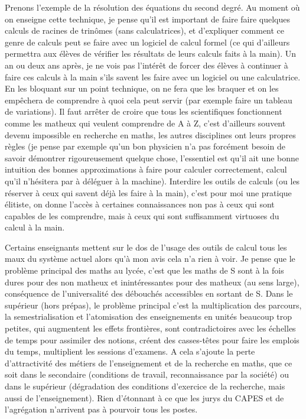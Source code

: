 \documentclass[a4paper,11pt]{book}
\begin{document}
\begin{giacjshere}
Prenons l'exemple de la r\'esolution des \'equations du second
degr\'e. Au moment o\`u on enseigne cette technique, je pense
qu'il est important de faire faire quelques calculs de racines 
de trin\^omes (sans
calculatrices), et d'expliquer comment ce genre de calculs peut
se faire avec un logiciel de calcul formel (ce qui d'ailleurs
permettra aux \'el\`eves de v\'erifier les r\'esultats
de leurs calculs faits \`a la main).
Un an ou deux ans apr\`es, je ne vois pas l'int\'er\^et de forcer
des \'el\`eves \`a continuer \`a faire ces calculs \`a la main
s'ils savent les faire avec un logiciel ou une calculatrice. En les
bloquant sur un point technique, on ne fera
que les braquer et on les emp\^echera de comprendre \`a quoi
cela peut servir (par exemple faire un tableau de variations).
Il faut arr\^eter de croire que tous les
scientifiques fonctionnent comme les matheux qui veulent
comprendre de A \`a Z, c'est d'ailleurs souvent devenu
impossible en recherche en maths, les autres disciplines
ont leurs propres r\`egles (je pense par exemple qu'un
bon physicien n'a pas forc\'ement besoin de savoir
d\'emontrer rigoureusement quelque chose, l'essentiel
est qu'il ait une bonne intuition des bonnes approximations
\`a faire pour calculer correctement, calcul qu'il n'h\'esitera
par \`a d\'el\'eguer \`a la machine). Interdire les outils
de calculs (ou les r\'eserver \`a ceux qui savent d\'ej\`a
les faire \`a la main), c'est pour moi une pratique \'elitiste,
on donne l'acc\`es \`a certaines connaissances non pas
\`a ceux qui sont capables de les comprendre, mais \`a
ceux qui sont suffisamment virtuoses du calcul \`a la main.

Certains enseignants mettent sur le dos de l'usage des outils de
calcul tous les maux du syst\`eme actuel alors qu'\`a mon avis cela n'a rien
\`a voir. Je pense que le probl\`eme principal des maths au lyc\'ee, 
c'est que les maths de S sont \`a la fois dures pour des non matheux
et inint\'eressantes pour des matheux (au sens large), cons\'equence
de l'universalit\'e des d\'ebouch\'es accessibles en sortant de S.
Dans le sup\'erieur (hors pr\'epas), le probl\`eme principal c'est
la multiplication des parcours, la semestrialisation 
et l'atomisation des enseignements
en unit\'es beaucoup trop petites, qui augmentent les effets
fronti\`eres, sont contradictoires avec les \'echelles de temps
pour assimiler des notions, cr\'eent des casses-t\^etes pour faire
les emplois du temps, multiplient les sessions d'examens. 
A cela s'ajoute la perte d'attractivit\'e des m\'etiers de
l'enseignement et de la recherche en maths, que ce soit
dans le secondaire (conditions de travail, reconnaissance
par la soci\'et\'e) ou dans le sup\'erieur (d\'egradation
des conditions d'exercice de la recherche, mais aussi
de l'enseignement). Rien d'\'etonnant \`a ce que les jurys
du CAPES et de l'agr\'egation n'arrivent pas \`a
pourvoir tous les postes.


\end{giacjshere}
\end{document}
